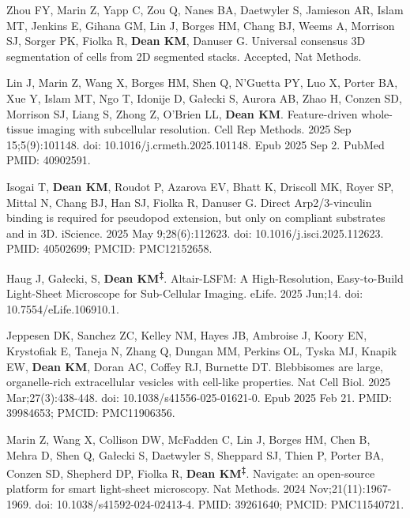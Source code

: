 \begin{etaremune}


\item Zhou FY, Marin Z, Yapp C, Zou Q, Nanes BA, Daetwyler S, Jamieson AR, Islam MT, Jenkins E, Gihana GM, Lin J, Borges HM, Chang BJ, Weems A, Morrison SJ, Sorger PK, Fiolka R, \textbf{Dean KM}, Danuser G. Universal consensus 3D segmentation of cells from 2D segmented stacks. Accepted, Nat Methods.

\item Lin J, Marin Z, Wang X, Borges HM, Shen Q, N'Guetta PY, Luo X, Porter BA, Xue Y, Islam MT, Ngo T, Idonije D, Gałecki S, Aurora AB, Zhao H, Conzen SD, Morrison SJ, Liang S, Zhong Z, O'Brien LL, \textbf{Dean KM}. Feature-driven whole-tissue imaging with subcellular resolution. Cell Rep Methods. 2025 Sep 15;5(9):101148. doi: 10.1016/j.crmeth.2025.101148. Epub 2025 Sep 2. PubMed PMID: 40902591.

\item Isogai T, \textbf{Dean KM}, Roudot P, Azarova EV, Bhatt K, Driscoll MK, Royer SP, Mittal N, Chang BJ, Han SJ, Fiolka R, Danuser G. Direct Arp2/3-vinculin binding is required for pseudopod extension, but only on compliant substrates and in 3D. iScience. 2025 May 9;28(6):112623. doi: 10.1016/j.isci.2025.112623. PMID: 40502699; PMCID: PMC12152658.

\item Haug J, Gałecki, S, \textbf{Dean KM\textsuperscript{‡}}. Altair-LSFM: A High-Resolution, Easy-to-Build Light-Sheet Microscope for Sub-Cellular Imaging. eLife. 2025 Jun;14. doi: 10.7554/eLife.106910.1.

\item Jeppesen DK, Sanchez ZC, Kelley NM, Hayes JB, Ambroise J, Koory EN, Krystofiak E, Taneja N, Zhang Q, Dungan MM, Perkins OL, Tyska MJ, Knapik EW, \textbf{Dean KM}, Doran AC, Coffey RJ, Burnette DT. Blebbisomes are large, organelle-rich extracellular vesicles with cell-like properties. Nat Cell Biol. 2025 Mar;27(3):438-448. doi: 10.1038/s41556-025-01621-0. Epub 2025 Feb 21. PMID: 39984653; PMCID: PMC11906356.

\item Marin Z, Wang X, Collison DW, McFadden C, Lin J, Borges HM, Chen B, Mehra D, Shen Q, Gałecki S, Daetwyler S, Sheppard SJ, Thien P, Porter BA, Conzen SD, Shepherd DP, Fiolka R, \textbf{Dean KM\textsuperscript{‡}}. Navigate: an open-source platform for smart light-sheet microscopy. Nat Methods. 2024 Nov;21(11):1967-1969. doi: 10.1038/s41592-024-02413-4. PMID: 39261640; PMCID: PMC11540721.


\end{etaremune}
